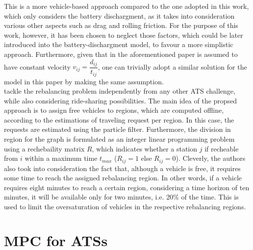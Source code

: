 This is a more vehicle-based approach compared to the one adopted in this work, which only considers the battery dischargment, as it takes into consideration various other aspects such as drag and rolling friction. For the purpose of this work, however, it has been chosen to neglect those factors, which could be later introduced into the battery-dischargment model, to favour a more simplistic approach. Furthermore, given that in the aforementioned paper is assumed to have constant velocity $v_{ij} = \dfrac{d_{ij}}{t_{ij}}$, one can trivially adopt a similar solution for the model in this paper by making the same assumption. \\
 tackle the rebalancing problem independently from any other ATS challenge, while also considering ride-sharing possibilities. The main idea of the propsed approach is to assign free vehicles to regions, which are computed offline, according to the estimations of traveling request per region. In this case, the requests are estimated using the particle filter. Furthermore, the division in region for the graph is formulated as an integer linear programming problem using a rechebaility matrix $R$, which indicates whether a station $j$ if recheable from $i$ within a maximum time $t_{max}$ ($R_{ij} = 1$ else $R_{ij} = 0$). Cleverly, the authors also took into consideration the fact that, although a vehicle is free, it requires some time to reach the assigned rebalancing region. In other words, if a vehicle requires eight minutes to reach a certain region, considering a time horizon of ten minutes, it will be available only for two minutes, i.e. 20\% of the time. This is used to limit the oversaturation of vehicles in the respective rebalancing regions.  
\section{MPC for ATSs}
